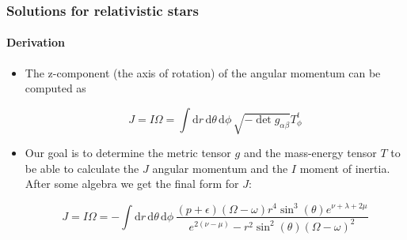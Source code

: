 \begin{frame}
\frametitle{Solutions for relativistic stars}
\framesubtitle{Derivation}

\begin{itemize}
	\item The z-component (the axis of rotation) of the angular momentum can be computed as
	\begin{block}{}
		\begin{equation}
			J
			=
			I \Omega
			=
			\int \mathrm{d}r\,\mathrm{d}\theta\,\mathrm{d}\phi\,
			\sqrt{- \det g_{\alpha \beta}} T^{t}_{\phi}
		\end{equation}
	\end{block}
	\item Our goal is to determine the metric tensor $g$ and the mass-energy tensor $T$ to be able to calculate the $J$ angular momentum and the $I$ moment of inertia. After some algebra we get the final form for $J$:
	\begin{block}{}
		\begin{equation}
			J
			=
			I \Omega
			=
			- \int \mathrm{d}r\,\mathrm{d}\theta\,\mathrm{d}\phi\,
			\frac{
				\left( p + \epsilon \right) \left( \Omega - \omega \right) r^{4} \sin^{3} \left( \theta \right) e^{\nu + \lambda + 2 \mu}
			}{
				e^{2 \left( \nu - \mu \right)}
				-
				r^{2} \sin^{2} \left( \theta \right) \left( \Omega - \omega \right)^{2}
			}
		\end{equation}
	\end{block}
\end{itemize}

\end{frame}

